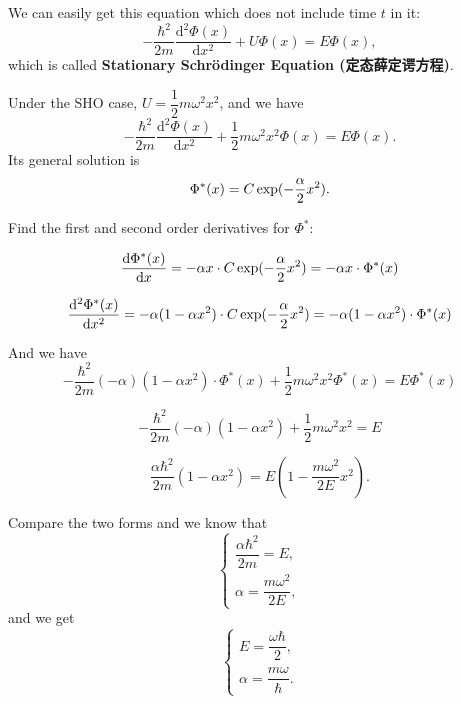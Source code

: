 We can easily get this equation which does not include time \(t\) in it: \[-\dfrac{ \hbar^2 }{2m}\dfrac{\mathrm d^2 \Phi(x)}{\mathrm d x ^2 } + U \Phi(x) =E\Phi(x),\] which is called \textbf{Stationary Schrödinger Equation (定态薛定谔方程)}.

Under the SHO case, \(U=\dfrac{1}{2}m\omega^2x^2\), and we have \[-\dfrac{ \hbar^2 }{2m}\dfrac{\mathrm d^2 \Phi(x)}{\mathrm d x ^2 } + \dfrac{1}{2}m\omega^2x^2 \Phi(x) =E\Phi(x).\] Its general solution is \[\Phi^*(x) = C \exp(-{\alpha \over 2} x^2).\]

Find the first and second order derivatives for \(\Phi^*\):

\[{\mathrm d\Phi^*(x) \over \mathrm dx} = -\alpha x\cdot C \exp(-{\alpha \over 2} x^2) = -\alpha x \cdot \Phi^*(x)\]

\[{\mathrm d^2\Phi^*(x) \over \mathrm dx^2} = -\alpha (1-\alpha x^2) \cdot C \exp(-{\alpha \over 2} x^2) = -\alpha (1-\alpha x^2) \cdot \Phi^*(x)\]

And we have \[-\dfrac{ \hbar^2 }{2m}(-\alpha)(1-\alpha x^2)\cdot \Phi^*(x)+\dfrac{1}{2}m\omega^2x^2 \Phi^*(x)=E \Phi^*(x)\]

\[-\dfrac{ \hbar^2 }{2m}(-\alpha)(1-\alpha x^2)+\dfrac{1}{2}m\omega^2x^2 =E \]

\[\dfrac{\alpha \hbar^2 }{2m}(1-\alpha x^2) = E\left(1 - \dfrac{m\omega^2}{2E}x^2\right).\]

Compare the two forms and we know that \[\left \{
\begin {array}{l}
    \dfrac{\alpha \hbar^2 }{2m} = E, \\[1.5ex]
    \alpha = \dfrac{m\omega^2}{2E},
    \end {array}
    \right.\] and we get \[\left \{
    \begin {array}{l}
    E = \dfrac{\omega \hbar}{2}, \\[1.5ex]
    \alpha = \dfrac{m\omega}{\hbar}.
\end {array}
\right.\]
